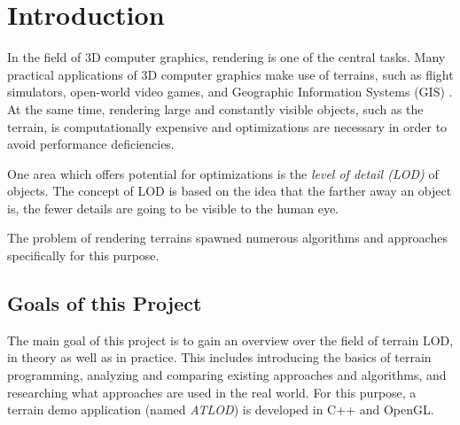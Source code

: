 \chapter{Introduction}
In the field of 3D computer graphics, rendering is one of the central tasks.
Many practical applications of 3D computer graphics make use of terrains, 
such as flight simulators, open-world video games, and Geographic Information Systems (GIS) \cite[p.~185]{lodfor3dgraphics}.
At the same time, rendering large and constantly visible objects, such as the terrain, is computationally expensive 
and optimizations are necessary in order to avoid performance deficiencies.

One area which offers potential for optimizations is the \textit{level of detail (LOD)} of objects.
The concept of LOD is based on the idea that the farther away an object is, the fewer details are going to be visible to the human eye.

The problem of rendering terrains spawned numerous algorithms and approaches specifically
for this purpose. 

\section{Goals of this Project}
The main goal of this project is to gain an overview over the field of 
terrain LOD, in theory as well as in practice. 
This includes introducing the basics of terrain programming,
analyzing and comparing existing approaches and algorithms, and
researching what approaches are used in the real world.
For this purpose, a terrain demo application (named \textit{ATLOD}) is developed
in C++ and OpenGL.


